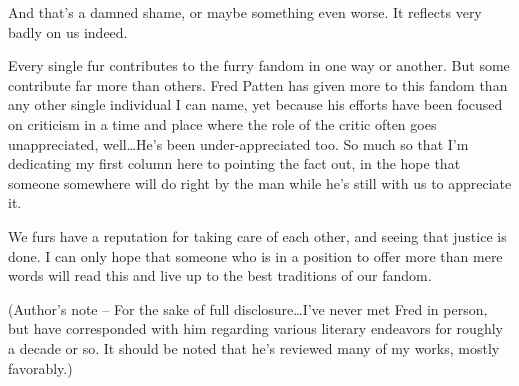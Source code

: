 And that's a damned shame, or maybe something even worse. It reflects very badly on us indeed.

Every single fur contributes to the furry fandom in one way or another. But some contribute far more than others. Fred Patten has given more to this fandom than any other single individual I can name, yet because his efforts have been focused on criticism in a time and place where the role of the critic often goes unappreciated, well\ldots  He's been under-appreciated too. So much so that I'm dedicating my first column here to pointing the fact out, in the hope that someone somewhere will do right by the man while he's still with us to appreciate it.

We furs have a reputation for taking care of each other, and seeing that justice is done. I can only hope that someone who is in a position to offer more than mere words will read this and live up to the best traditions of our fandom.

(Author's note -- For the sake of full disclosure\ldots  I've never met Fred in person, but have corresponded with him regarding various literary endeavors for roughly a decade or so. It should be noted that he's reviewed many of my works, mostly favorably.)
